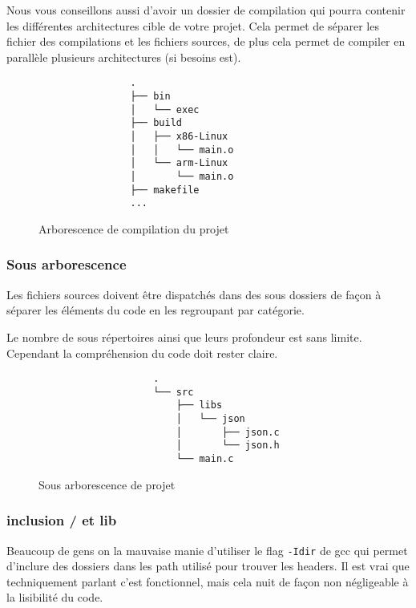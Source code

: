 		Nous vous conseillons aussi d'avoir un dossier de compilation qui pourra contenir les différentes architectures cible de votre projet. Cela permet de séparer les fichier des compilations et les fichiers sources, de plus cela permet de compiler en parallèle plusieurs architectures (si besoins est).

		\begin{figure}[H]
			\begin{changemargin}{-2.5cm}{-2.5cm}
			\begin{tcolorbox}
			\begin{verbatim}
				.
				├── bin
				│   └── exec
				├── build
				│   ├── x86-Linux
				│   │   └── main.o
				│   └── arm-Linux
				│       └── main.o
				├── makefile
				...
			\end{verbatim}
			\end{tcolorbox}
			\end{changemargin}
			\caption{Arborescence de compilation du projet}
		\end{figure}
		
		\subsubsection{Sous arborescence}
			Les fichiers sources doivent être dispatchés dans des sous dossiers de façon à séparer les éléments du code en les regroupant par catégorie.

			Le nombre de sous répertoires ainsi que leurs profondeur est sans limite. Cependant la compréhension du code doit rester claire.

			\begin{figure}[H]
				\begin{changemargin}{-2.5cm}{-2.5cm}
				\begin{tcolorbox}
				\begin{verbatim}
					.
					└── src
					    ├── libs
					    │   └── json
					    │       ├── json.c
					    │       └── json.h
					    └── main.c
				\end{verbatim}
				\end{tcolorbox}
				\end{changemargin}
				\caption{Sous arborescence de projet}
			\end{figure}

		\subsubsection{inclusion / et lib}
			Beaucoup de gens on la mauvaise manie d'utiliser le flag \verb+-Idir+ de gcc qui permet d'inclure des dossiers dans les path utilisé pour trouver les headers. Il est vrai que techniquement parlant c'est fonctionnel, mais cela nuit de façon non négligeable à la lisibilité du code.

